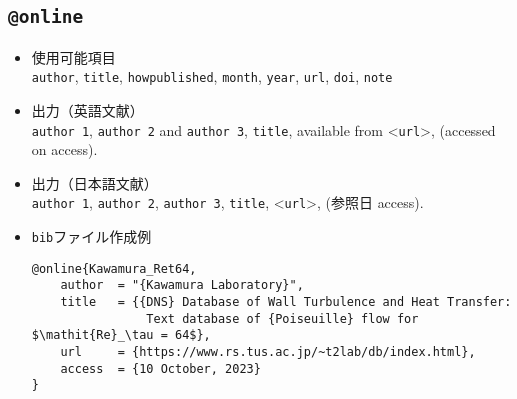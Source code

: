 \documentclass[a4paper,fleqn,uplatex,dvipdfmx]{jsarticle}
\begin{document}
\subsection{\texttt{@online}}
\label{ssec:online}
\begin{screen}
    \begin{itemize}
        \item 使用可能項目 \\
        \verb|author|, \verb|title|, \verb|howpublished|, \verb|month|, \verb|year|, \verb|url|, \verb|doi|, \verb|note|
        \item 出力（英語文献） \\
            \colorbox[gray]{0.8}{\texttt{author 1}}, \colorbox[gray]{0.8}{\texttt{author 2}} and \colorbox[gray]{0.8}{\texttt{author 3}}, \colorbox[gray]{0.8}{\texttt{title}}, available from \textless\colorbox[gray]{0.8}{\texttt{url}}\textgreater, (accessed on \colorbox[gray]{0.8}{access}).
        \item 出力（日本語文献） \\
            \colorbox[gray]{0.8}{\texttt{author 1}}, \colorbox[gray]{0.8}{\texttt{author 2}}, \colorbox[gray]{0.8}{\texttt{author 3}}, \colorbox[gray]{0.8}{\texttt{title}}, \textless\colorbox[gray]{0.8}{\texttt{url}}\textgreater, (参照日 \colorbox[gray]{0.8}{access}).
        \item \verb|bib|ファイル作成例 \vspace{-3mm}
\begin{verbatim}
@online{Kawamura_Ret64,
    author  = "{Kawamura Laboratory}",
    title   = {{DNS} Database of Wall Turbulence and Heat Transfer: 
                Text database of {Poiseuille} flow for $\mathit{Re}_\tau = 64$},
    url     = {https://www.rs.tus.ac.jp/~t2lab/db/index.html},
    access  = {10 October, 2023}
}
\end{verbatim}
    \end{itemize}
\end{screen}
\end{document}
